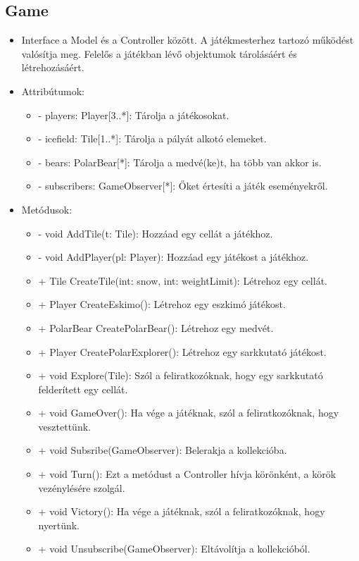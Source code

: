 \subsection{Game}
\begin{itemize}
	\item Interface a Model és a Controller között. A játékmesterhez tartozó működést valósítja meg. Felelős a játékban lévő objektumok tárolásáért és létrehozásáért.
	\item Attribútumok:
	\begin{itemize}
		\item - players: Player[3..*]: Tárolja a játékosokat.
		\item - icefield: Tile[1..*]: Tárolja a pályát alkotó elemeket.
		\item - bears: PolarBear[*]: Tárolja a medvé(ke)t, ha több van akkor is.
		\item - subscribers: GameObserver[*]:  Őket értesíti a játék eseményekről.
	\end{itemize}
	\item Metódusok:
	\begin{itemize}
		\item - void AddTile(t: Tile): Hozzáad egy cellát a játékhoz.
		\item - void AddPlayer(pl: Player): Hozzáad egy játékost a játékhoz.
		\item + Tile CreateTile(int: snow, int: weightLimit): Létrehoz egy cellát. 
		\item + Player CreateEskimo(): Létrehoz egy eszkimó játékost.
		\item + PolarBear CreatePolarBear(): Létrehoz egy medvét.
		\item + Player CreatePolarExplorer(): Létrehoz egy sarkkutató játékost.
		\item + void Explore(Tile): Szól a feliratkozóknak, hogy egy sarkkutató felderített egy cellát.
		\item + void GameOver(): Ha vége a játéknak, szól a feliratkozóknak, hogy vesztettünk.
		\item + void Subsribe(GameObserver): Belerakja a kollekcióba.
		\item + void Turn(): Ezt a metódust a Controller hívja körönként, a körök vezénylésére szolgál. 
		\item + void Victory(): Ha vége a játéknak, szól a feliratkozóknak, hogy nyertünk.
		\item + void Unsubscribe(GameObserver): Eltávolítja a kollekcióból.
	\end{itemize}
\end{itemize}


